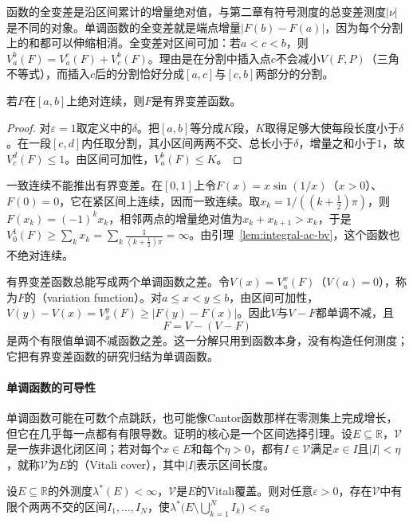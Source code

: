 函数的全变差是沿区间累计的增量绝对值，与第二章有符号测度的总变差测度$|\nu|$是不同的对象。单调函数的全变差就是端点增量$|F(b)-F(a)|$，因为每个分割上的和都可以伸缩相消。全变差对区间可加：若$a<c<b$，则$V_a^b(F)=V_a^c(F)+V_c^b(F)$。理由是在分割中插入点$c$不会减小$V(F,P)$（三角不等式），而插入$c$后的分割恰好分成$[a,c]$与$[c,b]$两部分的分割。

\begin{lemma}[绝对连续函数有界变差]
\label{lem:integral-ac-bv}
若$F$在$[a,b]$上绝对连续，则$F$是有界变差函数。
\end{lemma}

\begin{proof}
对$\varepsilon=1$取定义中的$\delta$。把$[a,b]$等分成$K$段，$K$取得足够大使每段长度小于$\delta$。在一段$[c,d]$内任取分割，其小区间两两不交、总长小于$\delta$，增量之和小于$1$，故$V_c^d(F)\le1$。由区间可加性，$V_a^b(F)\le K$。
\end{proof}

一致连续不能推出有界变差。在$[0,1]$上令$F(x)=x\sin(1/x)$（$x>0$）、$F(0)=0$，它在紧区间上连续，因而一致连续。取$x_k=1/((k+\frac12)\pi)$，则$F(x_k)=(-1)^kx_k$，相邻两点的增量绝对值为$x_k+x_{k+1}>x_k$，于是$V_0^1(F)\ge\sum_kx_k=\sum_k\frac1{(k+\frac12)\pi}=\infty$。由引理~\ref{lem:integral-ac-bv}，这个函数也不绝对连续。

有界变差函数总能写成两个单调函数之差。令$V(x)=V_a^x(F)$（$V(a)=0$），称为$F$的（variation function）。对$a\le x<y\le b$，由区间可加性，$V(y)-V(x)=V_x^y(F)\ge|F(y)-F(x)|$。因此$V$与$V-F$都单调不减，且
\[
 F=V-(V-F)
\]
是两个有限值单调不减函数之差。这一分解只用到函数本身，没有构造任何测度；它把有界变差函数的研究归结为单调函数。

\paragraph{单调函数的可导性}
单调函数可能在可数个点跳跃，也可能像Cantor函数那样在零测集上完成增长，但它在几乎每一点都有有限导数。证明的核心是一个区间选择引理。设$E\subseteq\mathbb R$，$\mathcal V$是一族非退化闭区间；若对每个$x\in E$和每个$\eta>0$，都有$I\in\mathcal V$满足$x\in I$且$|I|<\eta$，就称$\mathcal V$为$E$的（Vitali cover），其中$|I|$表示区间长度。

\begin{lemma}[Vitali覆盖引理]
\label{lem:integral-vitali}
设$E\subseteq\mathbb R$的外测度$\lambda^*(E)<\infty$，$\mathcal V$是$E$的Vitali覆盖。则对任意$\varepsilon>0$，存在$\mathcal V$中有限个两两不交的区间$I_1,\ldots,I_N$，使$\lambda^*\bigl(E\setminus\bigcup_{k=1}^NI_k\bigr)<\varepsilon$。
\end{lemma}

